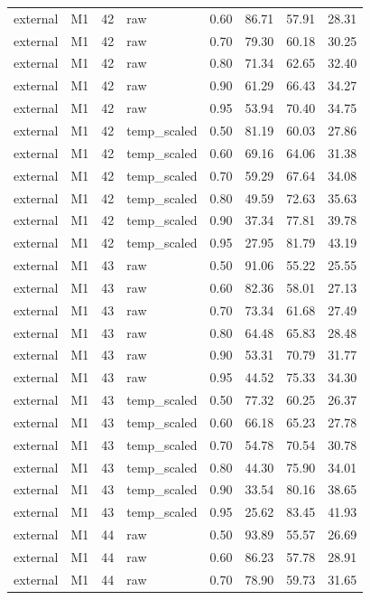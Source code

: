 \begin{tabular}{llrlrrrr}
external & M1 & 42 & raw & 0.60 & 86.71 & 57.91 & 28.31 \\
external & M1 & 42 & raw & 0.70 & 79.30 & 60.18 & 30.25 \\
external & M1 & 42 & raw & 0.80 & 71.34 & 62.65 & 32.40 \\
external & M1 & 42 & raw & 0.90 & 61.29 & 66.43 & 34.27 \\
external & M1 & 42 & raw & 0.95 & 53.94 & 70.40 & 34.75 \\
external & M1 & 42 & temp\_scaled & 0.50 & 81.19 & 60.03 & 27.86 \\
external & M1 & 42 & temp\_scaled & 0.60 & 69.16 & 64.06 & 31.38 \\
external & M1 & 42 & temp\_scaled & 0.70 & 59.29 & 67.64 & 34.08 \\
external & M1 & 42 & temp\_scaled & 0.80 & 49.59 & 72.63 & 35.63 \\
external & M1 & 42 & temp\_scaled & 0.90 & 37.34 & 77.81 & 39.78 \\
external & M1 & 42 & temp\_scaled & 0.95 & 27.95 & 81.79 & 43.19 \\
external & M1 & 43 & raw & 0.50 & 91.06 & 55.22 & 25.55 \\
external & M1 & 43 & raw & 0.60 & 82.36 & 58.01 & 27.13 \\
external & M1 & 43 & raw & 0.70 & 73.34 & 61.68 & 27.49 \\
external & M1 & 43 & raw & 0.80 & 64.48 & 65.83 & 28.48 \\
external & M1 & 43 & raw & 0.90 & 53.31 & 70.79 & 31.77 \\
external & M1 & 43 & raw & 0.95 & 44.52 & 75.33 & 34.30 \\
external & M1 & 43 & temp\_scaled & 0.50 & 77.32 & 60.25 & 26.37 \\
external & M1 & 43 & temp\_scaled & 0.60 & 66.18 & 65.23 & 27.78 \\
external & M1 & 43 & temp\_scaled & 0.70 & 54.78 & 70.54 & 30.78 \\
external & M1 & 43 & temp\_scaled & 0.80 & 44.30 & 75.90 & 34.01 \\
external & M1 & 43 & temp\_scaled & 0.90 & 33.54 & 80.16 & 38.65 \\
external & M1 & 43 & temp\_scaled & 0.95 & 25.62 & 83.45 & 41.93 \\
external & M1 & 44 & raw & 0.50 & 93.89 & 55.57 & 26.69 \\
external & M1 & 44 & raw & 0.60 & 86.23 & 57.78 & 28.91 \\
external & M1 & 44 & raw & 0.70 & 78.90 & 59.73 & 31.65 \\

\end{tabular}
